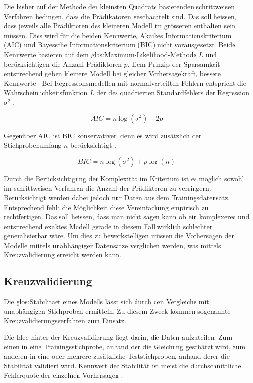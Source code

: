 Die bisher auf der Methode der kleinsten Quadrate basierenden schrittweisen Verfahren bedingen, dass die Prädikatoren geschachtelt sind. 
Das soll heissen, dass jeweils alle Prädiktoren des kleineren Modell im grösseren enthalten sein müssen. 
Dies wird für die  beiden Kennwerte, Akaikes Informationskriterium (AIC) und  Bayessche Informationskriterium (BIC) nicht vorausgesetzt. 
Beide Kennwerte basieren auf dem \Gls{glos:Maximum-Likelihood-Methode} $L$ und  berücksichtigen die Anzahl Prädiktoren $p$. 
Dem Prinzip der Sparsamkeit entsprechend geben kleinere Modell bei gleicher Vorhersagekraft, bessere Kennwerte \cite[p. 509]{jacob2003applied}. 
Bei Regressionsmodellen mit normalverteilten Fehlern entspricht die Wahrscheinlichkeitsfunktion $L$ der des quadrierten Standardfehlers der Regression $\sigma^2$ \cite[p. 169]{weakliem2004introduction}. 

\begin{equation}
AIC = n \log(\sigma^2) + 2p
\tag{AIC}
\end{equation}

Gegenüber AIC ist BIC konservativer, denn es wird zusätzlich der Stichprobenumfang $n$ berücksichtigt \cite[p. 169]{weakliem2004introduction}. 

\begin{equation}
BIC = n\log(\sigma^2) + p\log(n)
\tag{BIC}
\end{equation}

Durch die Berücksichtigung der Komplexität im Kriterium ist es möglich sowohl im schrittweisen Verfahren die Anzahl der Prädiktoren zu verringern.  Berücksichtigt werden dabei jedoch nur Daten aus dem Trainingsdatensatz. Entsprechend fehlt die Möglichkeit diese Vereinfachung empirisch zu rechtfertigen. Das soll heissen, dass man nicht sagen kann ob ein komplexeres und entsprechend exaktes Modell gerade in diesem Fall wirklich schlechter generalisierbar wäre. Um dies zu bewerkstelligen müssen die Vorhersagen der Modelle mittels unabhängiger Datensätze verglichen werden, was mittels Kreuzvalidierung erreicht werden kann. 

\subsection{Kreuzvalidierung}
Die \Gls{glos:Stabilitaet} eines Modells lässt sich durch den Vergleiche mit unabhängigen Stichproben ermitteln.
Zu diesem Zweck kommen sogenannte Kreuzvalidierungsverfahren zum Einsatz.

Die Idee hinter der Kreuzvalidierung liegt darin, die Daten aufzuteilen. Zum einen in eine Trainingsstichprobe, anhand der die Gleichung geschätzt wird, zum anderen in eine oder mehrere zusätzliche Teststichproben, anhand derer die Stabilität validiert wird. Kennwert der Stabilität ist meist die durchschnittliche Fehlerquote der einzelnen Vorhersagen \cite[p. 3]{arlot2010survey}. 

